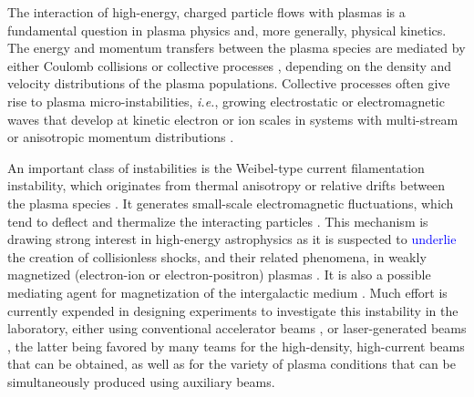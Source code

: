 \documentclass[aps,twocolumn,showpacs,superscriptaddress]{revtex4}
\begin{document}
The interaction of high-energy, charged particle flows with plasmas is a fundamental question in plasma physics and, more generally, physical kinetics. The energy and momentum transfers between the plasma species are mediated by either Coulomb collisions \cite{Shkarofsky_1966} or collective processes \cite{Belmont_2013}, depending on the density and velocity distributions of the plasma populations. Collective processes often give rise to plasma micro-instabilities, \emph{i.e.}, growing electrostatic or electromagnetic waves that develop at kinetic electron or ion scales in systems with multi-stream or anisotropic momentum distributions \cite{Davidson_1983}. 

An important class of instabilities is the Weibel-type current filamentation instability, which originates from thermal anisotropy \cite{PRL_Weibel_1959} or relative drifts between the plasma species \cite{POF_Fried_1959}. It generates small-scale electromagnetic fluctuations, which tend to deflect and thermalize the interacting particles \cite{POF_Davidson_1972, PRL_Lee_1973, APJ_Jaroschek_2004, PRL_Adam_2006}. This mechanism is drawing strong interest in high-energy astrophysics as it is suspected to \textcolor{blue}{underlie} the creation of collisionless shocks, and their related phenomena, in weakly magnetized (electron-ion or electron-positron) plasmas \cite{RPP_Marcowith_2016}. It is also a possible mediating agent for magnetization of the intergalactic medium \cite{APJ_Schlickeiser_2003}.
%
Much effort is currently expended in designing experiments to investigate this instability in the laboratory, either using conventional accelerator beams \cite{PRL_Allen_2012}, or laser-generated beams \cite{PRL_Fox_2013,NP_Huntington_2015},
the latter being favored by many teams for the high-density, high-current beams that can be obtained, as well as for the variety of plasma conditions that can be simultaneously produced using auxiliary beams. 
\end{document}

